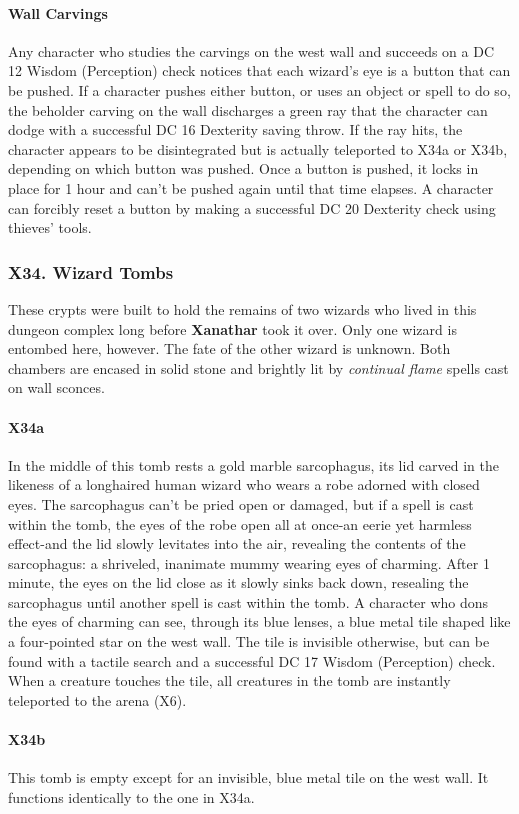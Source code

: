 \documentclass[10pt,a4paper,twoside,twocolumn,openany,nodeprecatedcode]{dndbook}
\begin{document}
\paragraph{Wall Carvings}
Any character who studies the carvings on the west wall and succeeds on a DC 12 Wisdom (Perception) check notices that each wizard's eye is a button that can be pushed. If a character pushes either button, or uses an object or spell to do so, the beholder carving on the wall discharges a green ray that the character can dodge with a successful DC 16 Dexterity saving throw. If the ray hits, the character appears to be disintegrated but is actually teleported to X34a or X34b, depending on which button was pushed. Once a button is pushed, it locks in place for 1 hour and can't be pushed again until that time elapses. A character can forcibly reset a button by making a successful DC 20 Dexterity check using thieves' tools.
\subsubsection{X34. Wizard Tombs}
These crypts were built to hold the remains of two wizards who lived in this dungeon complex long before \textbf{Xanathar} took it over. Only one wizard is entombed here, however. The fate of the other wizard is unknown. Both chambers are encased in solid stone and brightly lit by \textit{continual flame} spells cast on wall sconces.
\paragraph{X34a}
In the middle of this tomb rests a gold marble sarcophagus, its lid carved in the likeness of a longhaired human wizard who wears a robe adorned with closed eyes. The sarcophagus can't be pried open or damaged, but if a spell is cast within the tomb, the eyes of the robe open all at once-an eerie yet harmless effect-and the lid slowly levitates into the air, revealing the contents of the sarcophagus: a shriveled, inanimate mummy wearing eyes of charming. After 1 minute, the eyes on the lid close as it slowly sinks back down, resealing the sarcophagus until another spell is cast within the tomb.
A character who dons the eyes of charming can see, through its blue lenses, a blue metal tile shaped like a four-pointed star on the west wall. The tile is invisible otherwise, but can be found with a tactile search and a successful DC 17 Wisdom (Perception) check. When a creature touches the tile, all creatures in the tomb are instantly teleported to the arena (X6).
\paragraph{X34b}
This tomb is empty except for an invisible, blue metal tile on the west wall. It functions identically to the one in X34a.
\end{document}
